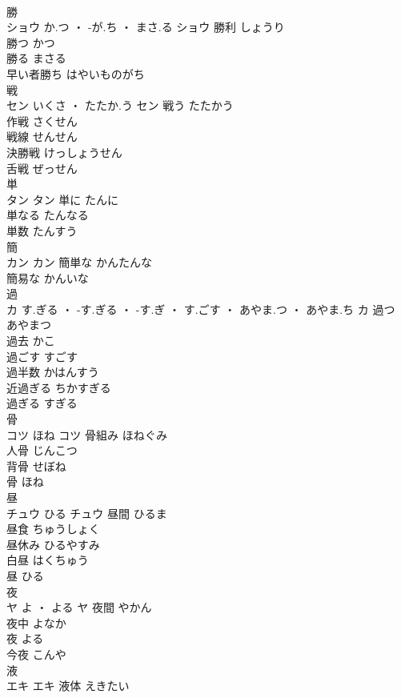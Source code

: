 \documentclass[8pt]{extreport}
\begin{document}
\begin{CJK}{UTF8}{min}
\\	勝	
\\	ショウ	か.つ ・ -が.ち ・ まさ.る	ショウ	勝利	しょうり	
\\	勝つ	かつ	
\\	勝る	まさる	
\\	早い者勝ち	はやいものがち	
\\	戦	
\\	セン	いくさ ・ たたか.う	セン	戦う	たたかう	
\\	作戦	さくせん	
\\	戦線	せんせん	
\\	決勝戦	けっしょうせん	
\\	舌戦	ぜっせん	
\\	単	
\\	タン		タン	単に	たんに	
\\	単なる	たんなる	
\\	単数	たんすう	
\\	簡	
\\	カン		カン	簡単な	かんたんな	
\\	簡易な	かんいな	
\\	過	
\\	カ	す.ぎる ・ -す.ぎる ・ -す.ぎ ・ す.ごす ・ あやま.つ ・ あやま.ち	カ	過つ	あやまつ	
\\	過去	かこ	
\\	過ごす	すごす	
\\	過半数	かはんすう	
\\	近過ぎる	ちかすぎる	
\\	過ぎる	すぎる	
\\	骨	
\\	コツ	ほね	コツ	骨組み	ほねぐみ	
\\	人骨	じんこつ	
\\	背骨	せぼね	
\\	骨	ほね	
\\	昼	
\\	チュウ	ひる	チュウ	昼間	ひるま	
\\	昼食	ちゅうしょく	
\\	昼休み	ひるやすみ	
\\	白昼	はくちゅう	
\\	昼	ひる	
\\	夜	
\\	ヤ	よ ・ よる	ヤ	夜間	やかん	
\\	夜中	よなか	
\\	夜	よる	
\\	今夜	こんや	
\\	液	
\\	エキ		エキ	液体	えきたい	

\end{CJK}
\end{document}

